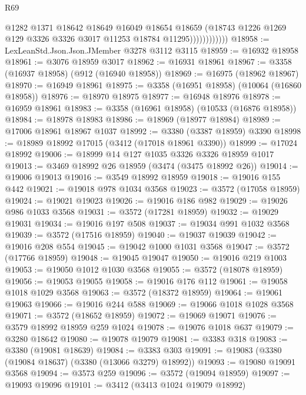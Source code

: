 \begin{lexlean}{R69}
\begin{coremodule}
                          @1282
                          @1371
                          @18642
                          @18649
                          @16049
                          @18654
                          @18659
                          (@18743
                            @1226
                            @1269
                            @129
                            @3326
                            @3326
                            @3017
                            @11253
                            @18784
                            @11295))))))))))))
@18958 := LexLeanStd.Json.Json.JMember @3278 @3112 @3115
@18959 := @16932 @18958
@18961 := @3076 @18959 @3017
@18962 := @16931 @18961
@18967 := @3358 (@16937 @18958) (@912 (@16940 @18958))
@18969 := @16975 (@18962 @18967)
@18970 := @16949 @18961
@18975 := @3358 (@16951 @18958) (@10064 (@16860 @18958))
@18976 := @18970 @18975
@18977 := @16948 @18976
@18978 := @16959 @18961
@18983 := @3358 (@16961 @18958) (@10533 (@16876 @18958))
@18984 := @18978 @18983
@18986 := @18969 (@18977 @18984)
@18989 := @17006 @18961 @18967 @1037
@18992 := @3380 (@3387 @18959) @3390
@18998 := @18989 @18992 @17015 (@3412 (@17018 @18961 @3390))
@18999 := @17024 @18992
@19006 := @18999 @14 @127 @1035 @3326 @3326 @18959 @1017
@19013 := @3469 @18992 @26 @18959 (@3474 (@3475 @18992 @26))
@19014 := @19006 @19013
@19016 := @3549 @18992 @18959
@19018 := @19016 @155 @442
@19021 := @19018 @978 @1034 @3568
@19023 := @3572 (@17058 @18959)
@19024 := @19021 @19023
@19026 := @19016 @186 @982
@19029 := @19026 @986 @1033 @3568
@19031 := @3572 (@17281 @18959)
@19032 := @19029 @19031
@19034 := @19016 @197 @508
@19037 := @19034 @991 @1032 @3568
@19039 := @3572 (@17516 @18959)
@19040 := @19037 @19039
@19042 := @19016 @208 @554
@19045 := @19042 @1000 @1031 @3568
@19047 := @3572 (@17766 @18959)
@19048 := @19045 @19047
@19050 := @19016 @219 @1003
@19053 := @19050 @1012 @1030 @3568
@19055 := @3572 (@18078 @18959)
@19056 := @19053 @19055
@19058 := @19016 @176 @112
@19061 := @19058 @1018 @1029 @3568
@19063 := @3572 (@18372 @18959)
@19064 := @19061 @19063
@19066 := @19016 @244 @588
@19069 := @19066 @1018 @1028 @3568
@19071 := @3572 (@18652 @18959)
@19072 := @19069 @19071
@19076 := @3579 @18992 @18959 @259 @1024
@19078 := @19076 @1018 @637
@19079 := @3280 @18642
@19080 := @19078 @19079
@19081 := @3383 @318
@19083 := @3380 (@19081 @18639)
@19084 := @3383 @303
@19091 := @19083 (@3380 (@19084 @18637) (@3380 (@13066 @3279) @18992))
@19093 := @19080 @19091 @3568
@19094 := @3573 @259
@19096 := @3572 (@19094 @18959)
@19097 := @19093 @19096
@19101 := @3412 (@3413 @1024 @19079 @18992)

\end{coremodule}
\end{lexlean}
